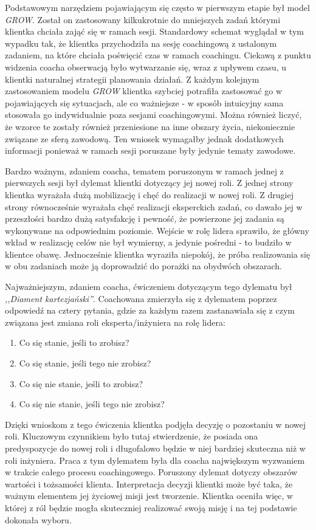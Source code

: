 Podstawowym narzędziem pojawiającym się często w pierwszym etapie był model \emph{GROW}. Został on zastosowany kilkukrotnie do mniejszych zadań
którymi klientka chciała zająć się w ramach sesji. Standardowy schemat wyglądał w tym wypadku tak, że klientka przychodziła na sesję coachingową
z ustalonym zadaniem, na które chciała poświęcić czas w ramach coachingu. Ciekawą z punktu widzenia coacha obserwacją było wytwarzanie się, wraz z upływem
czasu, u klientki naturalnej strategii planowania działań. Z każdym kolejnym zastosowaniem modelu \emph{GROW} klientka szybciej potrafiła zastosować
go w pojawiających się sytuacjach, ale co ważniejsze - w sposób intuicyjny sama stosowała go indywidualnie poza sesjami coachingowymi. Można również liczyć,
że wzorce te zostały również przeniesione na inne obszary życia, niekoniecznie związane ze sferą zawodową. Ten wniosek wymagałby jednak dodatkowych
informacji ponieważ w ramach sesji poruszane były jedynie tematy zawodowe.

Bardzo ważnym, zdaniem coacha, tematem poruszonym w ramach jednej z pierwszych sesji był dylemat klientki dotyczący jej nowej roli.
Z jednej strony klientka wyrażała dużą mobilizację i chęć do realizacji w nowej roli. Z drugiej strony równocześnie wyrażała chęć realizacji
eksperckich zadań, co dawało jej w przeszłości bardzo dużą satysfakcję i pewność, że powierzone jej zadania są wykonywane na odpowiednim poziomie.
Wejście w rolę lidera sprawiło, że główny wkład w realizację celów nie był wymierny, a jedynie pośredni - to budziło w klientce obawę.
Jednocześnie klientka wyraziła niepokój, że próba realizowania się w obu zadaniach może ją doprowadzić do porażki na obydwóch obszarach.

Najważniejszym, zdaniem coacha, ćwiczeniem dotyczącym tego dylematu był \emph{,,Diament kartezjański''}.
Coachowana zmierzyła się z dylematem poprzez odpowiedź na cztery pytania, gdzie za każdym razem zastanawiała się z czym związana jest zmiana
roli eksperta/inżyniera na rolę lidera:
\begin{enumerate}
\item Co się stanie, jeśli to zrobisz?
\item Co się stanie, jeśli tego nie zrobisz?
\item Co się nie stanie, jeśli to zrobisz?
\item Co się nie stanie, jeśli tego nie zrobisz?
\end{enumerate}
Dzięki wnioskom z tego ćwiczenia klientka podjęła decyzję o pozostaniu w nowej roli. Kluczowym czynnikiem było tutaj stwierdzenie, że posiada
ona predyspozycje do nowej roli i długofalowo będzie w niej bardziej skuteczna niż w roli inżyniera. Praca z tym dylematem była dla coacha
największym wyzwaniem w trakcie całego procesu coachingowego. Poruszony dylemat dotyczy obszarów wartości i tożsamości klienta. Interpretacja
decyzji klientki może być taka, że ważnym elementem jej życiowej misji jest tworzenie. Klientka oceniła więc, w której z ról będzie mogła skuteczniej
realizować swoją misję i na tej podstawie dokonała wyboru.

